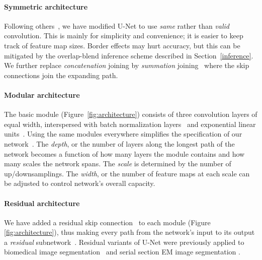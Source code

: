 \documentclass{article}
\begin{document}
\paragraph{Symmetric architecture} Following others~\cite{quan2016}, we have
modified U-Net to use \textit{same} rather than \textit{valid} convolution. This
is mainly for simplicity and convenience; it is easier to keep track of feature
map sizes.  Border effects may hurt accuracy, but this can be mitigated by the
overlap-blend inference scheme described in Section~\ref{inference}. We further
replace \textit{concatenation} joining by \textit{summation}
joining~\cite{quan2016,smith2016} where the skip connections join the expanding
path.


\paragraph{Modular architecture} The basic module
(Figure~\ref{fig:architecture}) consists of three convolution layers of equal
width, interspersed with batch normalization layers~\cite{ioffe2015} and
exponential linear units~\cite{clevert2015}. Using the same modules everywhere
simplifies the specification of our network~\cite{shen2017}. The \textit{depth},
or the number of layers along the longest path of the network becomes a function
of how many layers the module contains and how many scales the network spans.
The \textit{scale} is determined by the number of up/downsamplings. The
\textit{width}, or the number of feature maps at each scale can be adjusted to
control network's overall capacity.

\paragraph{Residual architecture}  We have added a residual skip
connection~\cite{he2015b} to each module (Figure \ref{fig:architecture}), thus
making every path from the network's input to its output a \textit{residual}
subnetwork~\cite{veit2016}. Residual variants of U-Net were previously applied
to biomedical image segmentation~\cite{milletari2016,yu2017} and serial section
EM image segmentation \cite{quan2016,fakhry2016}.
\end{document}
